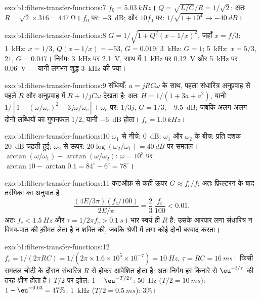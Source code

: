 \begin{solution}{exo:b1:filters-transfer-functions:7}
$f_0 = \qty{5.03}{kHz}$। $Q = \sqrt{L/C}/R = 1/\sqrt2$: अतः $R = \sqrt2 \times
316 = \qty{447}{\ohm}$। $f_0$ पर: \qty{-3}{dB}; और $10f_0$ पर: $1/\sqrt{1 +
10^4} \to \qty{-40}{dB}$।
\end{solution}

\begin{solution}{exo:b1:filters-transfer-functions:8}
$G = 1/\sqrt{1 + Q^2(x - 1/x)^2}$, जहाँ $x = f/3$: \qty{1}{kHz}: $x = 1/3$,
$Q(x - 1/x) = -53$, $G = 0.019$; \qty{3}{kHz}: $G = 1$; \qty{5}{kHz}:
$x = 5/3$, $21$, $G = 0.047$। निर्गम: \qty{3}{kHz} पर \qty{2.1}{V}, साथ में
\qty{1}{kHz} पर \qty{0.12}{V} और \qty{5}{kHz} पर \qty{0.06}{V} --- यानी
लगभग शुद्ध \qty{3}{kHz} की ज्या।
\end{solution}

\begin{solution}{exo:b1:filters-transfer-functions:9}
संधियाँ: $a = jRC\omega$ के साथ, पहला संधारित्र अनुप्रवाह से पहले $R$ और
अनुप्रवाह में $R + 1/jC\omega$ देखता है: अतः $\underline H = 1/(1 + 3a + a^2)$, यानी
$1/[1 - (\omega/\omega_c)^2 + 3j\omega/\omega_c]$। $\omega_c$ पर: $1/3j$,
$G = 1/3$, \qty{-9.5}{dB}; जबकि अलग-अलग दोनों लब्धियों का गुणनफल
$1/2$, यानी \qty{-6}{dB} होता। $f_c = \qty{1.0}{kHz}$।
\end{solution}

\begin{solution}{exo:b1:filters-transfer-functions:10}
$\omega_1$ से नीचे: \qty{0}{dB}; $\omega_1$ और $\omega_2$ के बीच: प्रति दशक
\qty{20}{dB} चढ़ती हुई; $\omega_2$ से ऊपर: $20\log(\omega_2/\omega_1) =
\qty{40}{dB}$ पर समतल।  $\arctan(\omega/\omega_1) - \arctan(\omega/\omega_2)$:
$\omega = 10^3$ पर $\arctan 10 - \arctan 0.1 = 84^\circ - 6^\circ =
78^\circ$।
\end{solution}

\begin{solution}{exo:b1:filters-transfer-functions:11}
कटऑफ़ से कहीं ऊपर $G \approx f_c/f$; अतः फ़िल्टरन के बाद तरंगिका का अनुपात
है
\[
\frac{(4E/3\pi)(f_c/100)}{2E/\pi} = \frac{2}{3}\,\frac{f_c}{100} < 0.01,
\]
अतः $f_c < \qty{1.5}{Hz}$ और $\tau = 1/2\pi f_c > \qty{0.1}{s}$। भार स्वयं ही
$R$ है: उसके आरपार लगा संधारित्र न विभव-पात की क़ीमत लेता है न शक्ति की,
जबकि श्रेणी में लगा कोई  दोनों बरबाद करता।
\end{solution}

\begin{solution}{exo:b1:filters-transfer-functions:12}
$f_c = 1/(2\pi RC) = 1/(2\pi \times 1.6\times10^5 \times 10^{-7}) =
\qty{10}{Hz}$, $\tau = RC = \qty{16}{ms}$। किसी समतल चोटी के दौरान
संधारित्र $R$ से होकर आवेशित होता है: अतः निर्गम हर किनारे से
$\eu^{-t/\tau}$ की तरह क्षीण होता है। $T/2$ पर झोल: $1 - \eu^{-T/2\tau}$: \qty{50}{Hz}
($T/2 = \qty{10}{ms}$): $1 - \eu^{-0.63} = 47\%$; \qty{1}{kHz}
($T/2 = \qty{0.5}{ms}$): $3\%$।
\end{solution}

